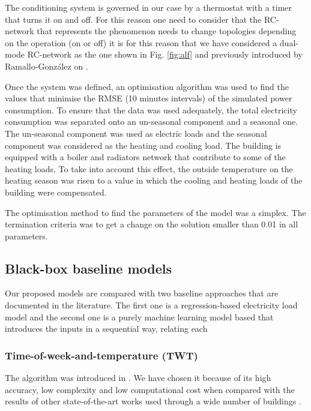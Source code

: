 \documentclass[10pt, conference, compsocconf]{IEEEtran}
\begin{document}
The conditioning system is governed in our case by a thermostat with a timer that turns it on and off. For this reason one need to consider that the RC-network that represents the phenomenon needs to change topologies depending on the operation (on or off) it is for this reason that we have considered a dual-mode RC-network as the one shown in Fig. \ref{fig:alf} and previously introduced by Ramallo-Gonz\'alez on \cite{ramalloidentifying}.




Once the system was defined, an optimisation algorithm was used to find the values that minimise the RMSE (10 minutes intervals) of the simulated power consumption. To ensure that the data was used adequately, the total electricity consumption was separated onto an un-seasonal component and a seasonal one. The un-seasonal component was used as electric loads and the seasonal component was considered as the heating and cooling load. The building is equipped with a boiler and radiators network that contribute to some of the heating loads. To take into account this effect, the outside temperature on the heating season was risen to a value in which the cooling and heating loads of the building were compensated.

The optimisation method to find the parameters of the model was a simplex. The termination criteria was to get a change on the solution smaller than 0.01 in all parameters. %

\subsection{Black-box baseline models}

Our proposed models are compared with two baseline approaches that are documented in the literature. The first one is a regression-based electricity load model and the second one is a purely machine learning model based that introduces the inputs in a sequential way, relating each 


\subsubsection{Time-of-week-and-temperature (TWT)}

The algorithm was introduced in \cite{mathieu2011quantifying}. We have chosen it because of its high accuracy, low complexity and low computational cost when compared with the results of other state-of-the-art works used through a wide number of buildings \cite{granderson2016accuracy}. 
\end{document}

